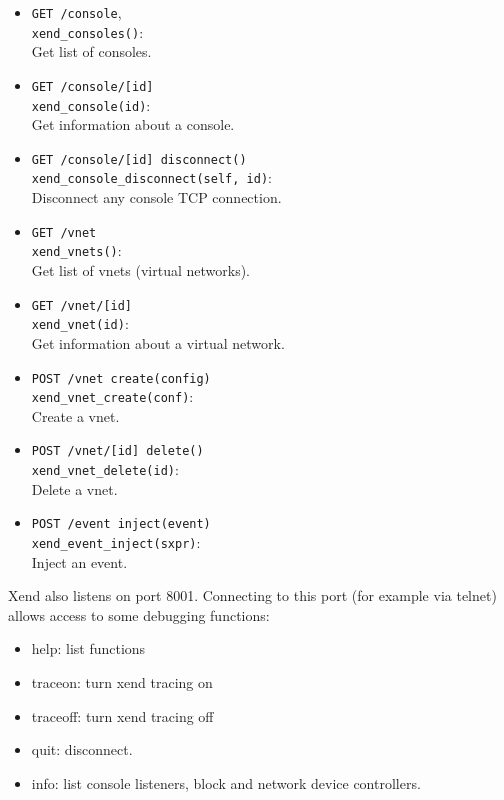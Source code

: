 \documentclass[11pt,twoside,final,openright]{xenstyle}
\begin{document}
\begin{itemize}
\item {\tt GET /console},\\
  {\tt xend\_consoles()}:\\
  Get list of consoles.

\item {\tt GET /console/[id]}\\
  {\tt xend\_console(id)}:\\
  Get information about a console.

\item {\tt GET /console/[id] disconnect()}\\
  {\tt xend\_console\_disconnect(self, id)}:\\
  Disconnect any console TCP connection.

\item {\tt GET /vnet}\\
  {\tt xend\_vnets()}:\\
  Get list of vnets (virtual networks).

\item {\tt GET /vnet/[id]}\\
  {\tt xend\_vnet(id)}:\\
  Get information about a virtual network.

\item {\tt POST /vnet create(config)}\\
  {\tt xend\_vnet\_create(conf)}:\\
  Create a vnet.

\item {\tt POST /vnet/[id] delete()}\\
  {\tt xend\_vnet\_delete(id)}:\\
  Delete a vnet.

\item {\tt POST /event inject(event)}\\
  {\tt xend\_event\_inject(sxpr)}:\\
  Inject an event.

\end{itemize}

Xend also listens on port 8001. Connecting to this port (for example via telnet)
allows access to some debugging functions:
\begin{itemize}
\item help: list functions
\item traceon: turn xend tracing on
\item traceoff: turn xend tracing off
\item quit: disconnect.
\item info: list console listeners, block and network device controllers.
\end{itemize}
\end{document}
